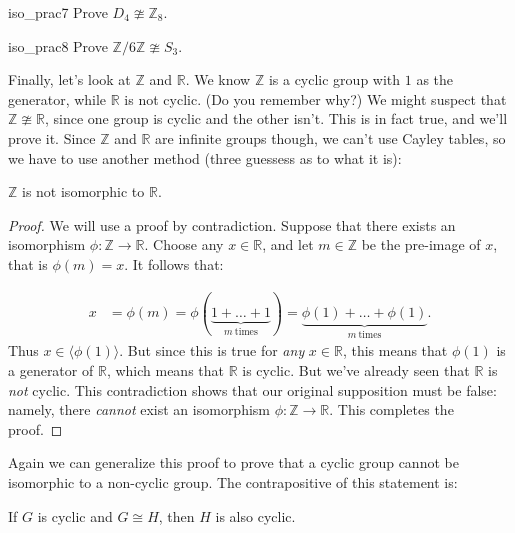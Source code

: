 \begin{exercise}{iso_prac7}
Prove $D_4 \ncong {\mathbb Z}_8$.
\end{exercise}

\begin{exercise}{iso_prac8}
Prove  ${\mathbb Z}/ 6 {\mathbb Z} \ncong S_3$.
\end{exercise}


Finally, let's look at ${\mathbb Z}$ and ${\mathbb R}$.  We know ${\mathbb Z}$ is a cyclic group with $1$ as the generator, while ${\mathbb R}$ is not cyclic. (Do you remember why?)  We might suspect  that  ${\mathbb Z} \ncong {\mathbb R}$, since one group is cyclic and the other isn't.  This is in fact true, and we'll prove it.   Since ${\mathbb Z}$ and ${\mathbb R}$ are infinite groups though, we can't use Cayley tables, so we have to use another method (three guessess as to what it is):

\begin{thm}\label{not_isomorph_cyclic}
${\mathbb Z}$ is not isomorphic to ${\mathbb R}$.
\end{thm}
\begin{proof}
We will use a proof by contradiction.   Suppose that there exists an isomorphism $\phi: {\mathbb Z} \rightarrow {\mathbb R}$.  Choose any $x \in {\mathbb R}$, and let $m \in {\mathbb Z}$ be the pre-image of $x$, that is $\phi(m) = x$.  It follows that: 

\begin{align*}
x &= \phi(m) = \phi(\underbrace{1 + \ldots + 1}_{m~\textrm{times}})= \underbrace{\phi(1) + \ldots + \phi(1)}_{m~\textrm{times}}.
\end{align*}
Thus $x \in \langle  \phi(1) \rangle$.  But since this is true for \emph{any} $x \in {\mathbb R}$, this means that  $\phi(1)$ is a generator of  ${\mathbb R}$, which means that ${\mathbb R}$ is cyclic. But we've already seen that 
${\mathbb R}$ is \emph{not} cyclic. This contradiction shows that our original supposition must be false: namely, there \emph{cannot} exist an isomorphism $\phi: {\mathbb Z} \rightarrow {\mathbb R}$. This completes the proof.
\end{proof}

\noindent
Again we can generalize this proof to prove that a cyclic group cannot be isomorphic to a non-cyclic group. The contrapositive of this statement is:

\begin{thm}\label{cyclic_noncyclic}
If $G$ is cyclic and $G \cong H$, then $H$ is also cyclic.
\end{thm}


